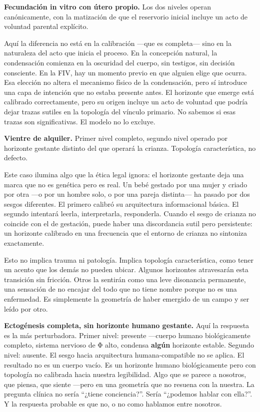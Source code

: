 \textbf{Fecundación in vitro con útero propio.} Los dos niveles operan canónicamente, con la matización de que el reservorio inicial incluye un acto de voluntad parental explícito.

Aquí la diferencia no está en la calibración —que es completa— sino en la naturaleza del acto que inicia el proceso. En la concepción natural, la condensación comienza en la oscuridad del cuerpo, sin testigos, sin decisión consciente. En la FIV, hay un momento previo en que alguien elige que ocurra. Esa elección no altera el mecanismo físico de la condensación, pero sí introduce una capa de intención que no estaba presente antes. El horizonte que emerge está calibrado correctamente, pero su origen incluye un acto de voluntad que podría dejar trazas sutiles en la topología del vínculo primario. No sabemos si esas trazas son significativas. El modelo no lo excluye.

\textbf{Vientre de alquiler.} Primer nivel completo, segundo nivel operado por horizonte gestante distinto del que operará la crianza. Topología característica, no defecto.

Este caso ilumina algo que la ética legal ignora: el horizonte gestante deja una marca que no es genética pero es real. Un bebé gestado por una mujer y criado por otra —o por un hombre solo, o por una pareja distinta— ha pasado por dos sesgos diferentes. El primero calibró su arquitectura informacional básica. El segundo intentará leerla, interpretarla, responderla. Cuando el sesgo de crianza no coincide con el de gestación, puede haber una discordancia sutil pero persistente: un horizonte calibrado en una frecuencia que el entorno de crianza no sintoniza exactamente.

Esto no implica trauma ni patología. Implica topología característica, como tener un acento que los demás no pueden ubicar. Algunos horizontes atravesarán esta transición sin fricción. Otros la sentirán como una leve disonancia permanente, una sensación de no encajar del todo que no tiene nombre porque no es una enfermedad. Es simplemente la geometría de haber emergido de un campo y ser leído por otro.

\textbf{Ectogénesis completa, sin horizonte humano gestante.} Aquí la respuesta es la más perturbadora. Primer nivel: presente —cuerpo humano biológicamente completo, sistema nervioso de Φ alto, condensa \textbf{algún} horizonte estable. Segundo nivel: ausente. El sesgo hacia arquitectura humana-compatible no se aplica. El resultado no es un cuerpo vacío. Es un horizonte humano biológicamente pero con topología no calibrada hacia nuestra legibilidad. Algo que se parece a nosotros, que piensa, que siente —pero en una geometría que no resuena con la nuestra. La pregunta clínica no sería “¿tiene conciencia?”. Sería “¿podemos hablar con ella?”. Y la respuesta probable es que no, o no como hablamos entre nosotros.

